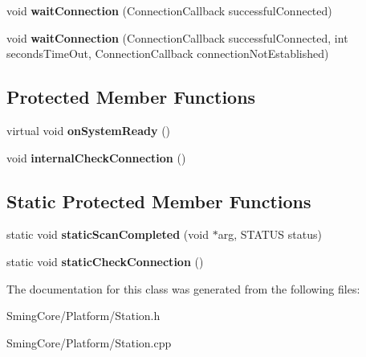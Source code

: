 \begin{DoxyCompactItemize}
\item 
\hypertarget{class_station_class_a980dd3a0a1226eb840fa38a0f47fb522}{}void {\bfseries wait\+Connection} (Connection\+Callback successful\+Connected)\label{class_station_class_a980dd3a0a1226eb840fa38a0f47fb522}

\item 
\hypertarget{class_station_class_ac311ec6565c7cb40e7dfd3fd4ee1def3}{}void {\bfseries wait\+Connection} (Connection\+Callback successful\+Connected, int seconds\+Time\+Out, Connection\+Callback connection\+Not\+Established)\label{class_station_class_ac311ec6565c7cb40e7dfd3fd4ee1def3}

\end{DoxyCompactItemize}
\subsection*{Protected Member Functions}
\begin{DoxyCompactItemize}
\item 
\hypertarget{class_station_class_aff302d5d7f1d731cb10bbdd4318a9c6a}{}virtual void {\bfseries on\+System\+Ready} ()\label{class_station_class_aff302d5d7f1d731cb10bbdd4318a9c6a}

\item 
\hypertarget{class_station_class_ac42c43d86c9012c57cee313edef1dce1}{}void {\bfseries internal\+Check\+Connection} ()\label{class_station_class_ac42c43d86c9012c57cee313edef1dce1}

\end{DoxyCompactItemize}
\subsection*{Static Protected Member Functions}
\begin{DoxyCompactItemize}
\item 
\hypertarget{class_station_class_a14c0e92fdddbd4a704e0fcd6e7eb12ef}{}static void {\bfseries static\+Scan\+Completed} (void $\ast$arg, S\+T\+A\+T\+U\+S status)\label{class_station_class_a14c0e92fdddbd4a704e0fcd6e7eb12ef}

\item 
\hypertarget{class_station_class_af8d5ea5e2204a1894425ace25a5db8e4}{}static void {\bfseries static\+Check\+Connection} ()\label{class_station_class_af8d5ea5e2204a1894425ace25a5db8e4}

\end{DoxyCompactItemize}


The documentation for this class was generated from the following files\+:\begin{DoxyCompactItemize}
\item 
Sming\+Core/\+Platform/Station.\+h\item 
Sming\+Core/\+Platform/Station.\+cpp\end{DoxyCompactItemize}
